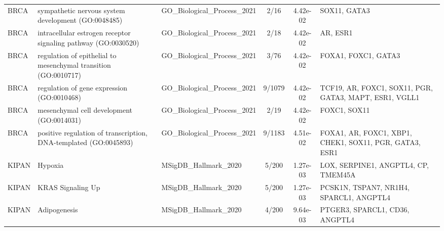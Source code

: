 \documentclass[utf8]{frontiers_suppmat}
\begin{document}
\begin{longtable}{lp{4.2cm}p{2.6cm}ccp{3.4cm}}
BRCA & sympathetic nervous system development (GO:0048485) & GO\_Biological\_Process\_2021 & 2/16 & 4.42e-02 & SOX11, GATA3 \\
BRCA & intracellular estrogen receptor signaling pathway (GO:0030520) & GO\_Biological\_Process\_2021 & 2/18 & 4.42e-02 & AR, ESR1 \\
BRCA & regulation of epithelial to mesenchymal transition (GO:0010717) & GO\_Biological\_Process\_2021 & 3/76 & 4.42e-02 & FOXA1, FOXC1, GATA3 \\
BRCA & regulation of gene expression (GO:0010468) & GO\_Biological\_Process\_2021 & 9/1079 & 4.42e-02 & TCF19, AR, FOXC1, SOX11, PGR, GATA3, MAPT, ESR1, VGLL1 \\
BRCA & mesenchymal cell development (GO:0014031) & GO\_Biological\_Process\_2021 & 2/19 & 4.42e-02 & FOXC1, SOX11 \\
BRCA & positive regulation of transcription, DNA-templated (GO:0045893) & GO\_Biological\_Process\_2021 & 9/1183 & 4.51e-02 & FOXA1, AR, FOXC1, XBP1, CHEK1, SOX11, PGR, GATA3, ESR1 \\
KIPAN & Hypoxia & MSigDB\_Hallmark\_2020 & 5/200 & 1.27e-03 & LOX, SERPINE1, ANGPTL4, CP, TMEM45A \\
KIPAN & KRAS Signaling Up & MSigDB\_Hallmark\_2020 & 5/200 & 1.27e-03 & PCSK1N, TSPAN7, NR1H4, SPARCL1, ANGPTL4 \\
KIPAN & Adipogenesis & MSigDB\_Hallmark\_2020 & 4/200 & 9.64e-03 & PTGER3, SPARCL1, CD36, ANGPTL4 \\
\end{longtable}
\end{document}

